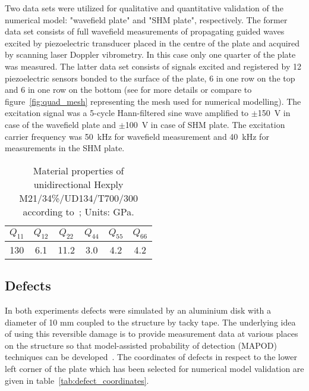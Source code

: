 \documentclass[12pt]{iopart}
\begin{document}
Two data sets were utilized for qualitative and quantitative validation of the numerical model: "wavefield plate" and "SHM plate", respectively. The former data set consists of full wavefield measurements of propagating guided waves excited by piezoelectric transducer placed in the centre of the plate and acquired by scanning laser Doppler vibrometry. In this case only one quarter of the plate was measured. The latter data set consists of signals excited and registered by 12 piezoelectric sensors bonded to the surface of the plate, 6 in one row on the top and 6 in one row on the bottom (see \cite{Moll2018} for more details or compare to figure~\ref{fig:quad_mesh} representing the mesh used for numerical modelling). The excitation signal was a 5-cycle Hann-filtered sine wave amplified to $\pm$150~V in case of the wavefield plate and  $\pm$100~V in case of SHM plate. The excitation carrier frequency was 50~kHz for wavefield measurement and 40~kHz for measurements in the SHM plate.
\begin{table}
	\caption{Material properties of unidirectional Hexply M21/34\%/UD134/T700/300 according to~\cite{Moll2018}; Units: GPa.}
	\begin{indented}
	\item[]	\begin{tabular}{cccccc} 
		\toprule
		$Q_{11}$ & $Q_{12}$  & $Q_{22}$ & $Q_{44}$ & $Q_{55}$ & $Q_{66}$\\
		\midrule
		130& 6.1& 11.2 & 3.0 & 4.2 & 4.2\\
		\bottomrule 
	\end{tabular} 
	\label{tab:mat_prop}
	\end{indented}
\end{table}

\subsection{Defects}
In both experiments defects were simulated by an aluminium disk with a diameter of 10 mm coupled to the structure by tacky tape. The underlying idea of using this reversible damage is to provide measurement data at various places on the structure so that model-assisted probability of detection (MAPOD) techniques can be developed~\cite{Eckstein2012}. The coordinates of defects in respect to the lower left corner of the plate which has been selected for numerical model validation are given in table~\ref{tab:defect_coordinates}.
\end{document}

